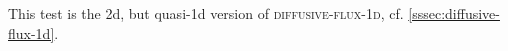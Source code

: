 
This test is the 2d, but quasi-1d version of \textsc{diffusive-flux-1d}, cf. \cref{sssec:diffusive-flux-1d}.

